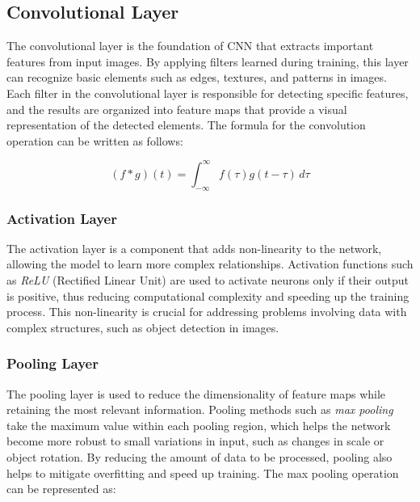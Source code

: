 \subsection{Convolutional Layer}
\label{subsubsec:Convolutional Layer}

The convolutional layer is the foundation of CNN that extracts important features from input images. By applying filters learned during training, this layer can recognize basic elements such as edges, textures, and patterns in images. Each filter in the convolutional layer is responsible for detecting specific features, and the results are organized into feature maps that provide a visual representation of the detected elements. The formula for the convolution operation can be written as follows:

\begin{equation}
  (f * g)(t) = \int_{-\infty}^{\infty} f(\tau)g(t - \tau) \, d\tau
\end{equation}

\subsubsection{Activation Layer}
\label{subsubsec:Activation Layer}

The activation layer is a component that adds non-linearity to the network, allowing the model to learn more complex relationships. Activation functions such as \emph{ReLU} (Rectified Linear Unit) are used to activate neurons only if their output is positive, thus reducing computational complexity and speeding up the training process. This non-linearity is crucial for addressing problems involving data with complex structures, such as object detection in images.

\subsubsection{Pooling Layer}
\label{subsubsec:Pooling Layer}

The pooling layer is used to reduce the dimensionality of feature maps while retaining the most relevant information. Pooling methods such as \emph{max pooling} take the maximum value within each pooling region, which helps the network become more robust to small variations in input, such as changes in scale or object rotation. By reducing the amount of data to be processed, pooling also helps to mitigate overfitting and speed up training. The max pooling operation can be represented as:

